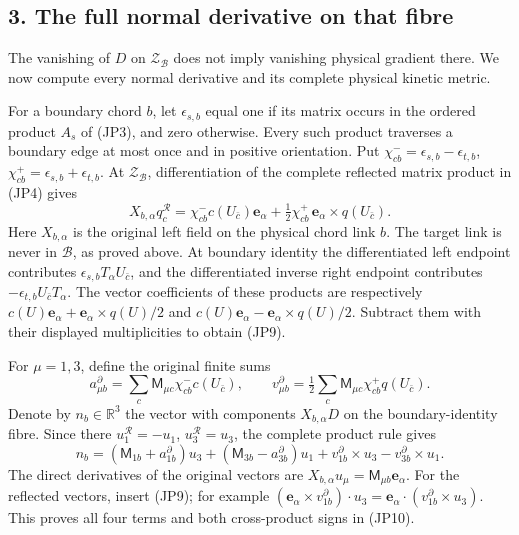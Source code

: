 \documentclass[11pt]{article}
\begin{document}
\subsection*{3. The full normal derivative on that fibre}

The vanishing of \(D\) on \(\mathcal Z_{\mathcal B}\) does not imply
vanishing physical gradient there. We now compute every normal derivative
and its complete physical kinetic metric.

For a boundary chord \(b\), let \(\epsilon_{s,b}\) equal one if its
matrix occurs in the ordered product \(A_s\) of (JP3), and zero otherwise.
Every such product traverses a boundary edge at most once and in positive
orientation. Put
\(\chi^-_{cb}=\epsilon_{s,b}-\epsilon_{t,b}\),
\(\chi^+_{cb}=\epsilon_{s,b}+\epsilon_{t,b}\).
At \(\mathcal Z_{\mathcal B}\), differentiation of the complete
reflected matrix product in (JP4) gives
\[
 X_{b,\alpha}q_c^{\mathcal R}
   =\chi^-_{cb}c(U_{\bar c})\mathbf e_\alpha
       +\tfrac12\chi^+_{cb}\,\mathbf e_\alpha\times q(U_{\bar c}).
 \tag{JP9}
\]
Here \(X_{b,\alpha}\) is the original left field on the physical chord
link \(b\). The target link is never in \(\mathcal B\), as proved
above. At boundary identity the differentiated left endpoint contributes
\(\epsilon_{s,b}T_\alpha U_{\bar c}\), and the differentiated inverse
right endpoint contributes \(-\epsilon_{t,b}U_{\bar c}T_\alpha\).
The vector coefficients of these products are respectively
\(c(U)\mathbf e_\alpha+\mathbf e_\alpha\times q(U)/2\) and
\(c(U)\mathbf e_\alpha-\mathbf e_\alpha\times q(U)/2\).
Subtract them with their displayed multiplicities to obtain (JP9).

For \(\mu=1,3\), define the original finite sums
\[
 a_{\mu b}^{\partial}
   =\sum_c\mathsf M_{\mu c}\chi^-_{cb}c(U_{\bar c}),\qquad
 v_{\mu b}^{\partial}
   =\tfrac12\sum_c\mathsf M_{\mu c}\chi^+_{cb}q(U_{\bar c}).
\]
Denote by \(n_b\in\mathbb R^3\) the vector with components
\(X_{b,\alpha}D\) on the boundary-identity fibre. Since there
\(u_1^{\mathcal R}=-u_1\), \(u_3^{\mathcal R}=u_3\), the complete
product rule gives
\[
\boxed{
 n_b=(\mathsf M_{1b}+a_{1b}^{\partial})u_3
       +(\mathsf M_{3b}-a_{3b}^{\partial})u_1
       +v_{1b}^{\partial}\times u_3
       -v_{3b}^{\partial}\times u_1.}
\tag{JP10}
\]
The direct derivatives of the original vectors are
\(X_{b,\alpha}u_\mu=\mathsf M_{\mu b}\mathbf e_\alpha\).
For the reflected vectors, insert (JP9); for example
\((\mathbf e_\alpha\times v_{1b}^{\partial})\cdot u_3
=\mathbf e_\alpha\cdot(v_{1b}^{\partial}\times u_3)\).
This proves all four terms and both cross-product signs in (JP10).
\end{document}
